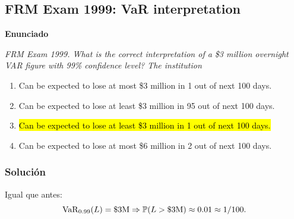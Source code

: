 ﻿\subsection{FRM Exam 1999: VaR interpretation}

\textbf{Enunciado}

\emph{FRM Exam 1999. What is the correct interpretation of a \$3 million
overnight VAR figure with 99\% confidence level? The institution}
\begin{enumerate}[label=\alph*.]
\item {Can be expected to lose at most \$3 million in 1 out of next 100 days.}
\item {Can be expected to lose at least \$3 million in 95 out of next 100 days.}
\item \hl{Can be expected to lose at least \$3 million in 1 out of next 100 days.}
\item {Can be expected to lose at most \$6 million in 2 out of next 100 days.}
\end{enumerate}

\subsubsection*{Solución}

Igual que antes:
\[
\mathrm{VaR}_{0.99}(L)=\$3\text{M}\Rightarrow \mathbb{P}(L>\$3\text{M})\approx 0.01 \approx 1/100.
\]











